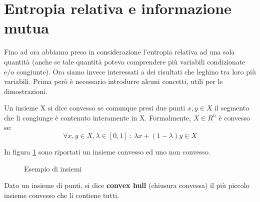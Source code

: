 \section{Entropia relativa e informazione mutua}
Fino ad ora abbiamo preso in considerazione l'entropia relativa ad una sola quantità (anche se tale quantità poteva comprendere più variabili condizionate e/o congiunte). Ora siamo invece interessati a dei risultati che leghino tra loro più variabili.
Prima però è necessario introdurre alcuni concetti, utili per le dimostrazioni.

\begin{definizione}
 Un insieme X si dice convesso se comunque presi due punti $x,y \in X$ il segmento che li congiunge è contenuto interamente in X.
 Formalmente, $X \in R^n$ è convesso se:
 \[
  \forall x,y \in X, \lambda \in [0,1] \ : \ \lambda x + (1-\lambda) y \in X
 \]
\end{definizione}

\noindent
In figura \ref{convessi} sono riportati un insieme convesso ed uno non convesso.

\begin{figure}[htbp]
\centering
{}
\hspace{5mm}
\caption{Esempio di insiemi}
\label{convessi}
\end{figure}

\begin{definizione}
 Dato un insieme di punti, si dice \textbf{convex hull} (chiusura convessa) il più piccolo insieme convesso che li contiene tutti.
\end{definizione}


